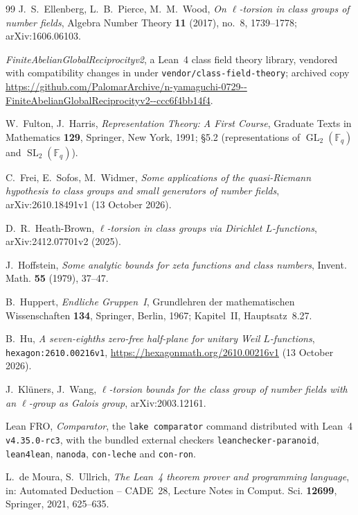 \documentclass[11pt]{amsart}
\theoremstyle{definition}
\theoremstyle{remark}
\newcommand{\F}{\mathbb{F}}
\DeclareMathOperator{\GL}{GL}
\DeclareMathOperator{\SL}{SL}
\begin{document}
\begin{thebibliography}{99}
J.~S.~Ellenberg, L.~B.~Pierce, M.~M.~Wood, \emph{On $\ell$-torsion in class groups of number fields}, Algebra Number
Theory \textbf{11} (2017), no.~8, 1739--1778; arXiv:1606.06103.

\emph{FiniteAbelianGlobalReciprocityv2}, a Lean~4 class field theory library, vendored with compatibility changes in
\cite{CT-Lean} under \texttt{vendor/class-field-theory}; archived copy
\url{https://github.com/PalomarArchive/n-yamaguchi-0729--FiniteAbelianGlobalReciprocityv2--ccc6f4bb14f4}.

W.~Fulton, J.~Harris, \emph{Representation Theory: A First Course}, Graduate Texts in Mathematics \textbf{129},
Springer, New York, 1991; \S5.2 (representations of $\GL_2(\F_q)$ and $\SL_2(\F_q)$).

C.~Frei, E.~Sofos, M.~Widmer, \emph{Some applications of the quasi-Riemann hypothesis to class groups and small
generators of number fields}, arXiv:2610.18491v1 (13 October 2026).

D.~R.~Heath-Brown, \emph{$\ell$-torsion in class groups via Dirichlet $L$-functions}, arXiv:2412.07701v2 (2025).

J.~Hoffstein, \emph{Some analytic bounds for zeta functions and class numbers}, Invent. Math. \textbf{55} (1979),
37--47.

B.~Huppert, \emph{Endliche Gruppen~I}, Grundlehren der mathematischen Wissenschaften \textbf{134}, Springer,
Berlin, 1967; Kapitel~II, Hauptsatz~8.27.

B.~Hu, \emph{A seven-eighths zero-free half-plane for unitary Weil $L$-functions}, \texttt{hexagon:2610.00216v1},
\url{https://hexagonmath.org/2610.00216v1} (13 October 2026).

J.~Kl\"uners, J.~Wang, \emph{$\ell$-torsion bounds for the class group of number fields with an $\ell$-group as Galois
group}, arXiv:2003.12161.

Lean FRO, \emph{Comparator}, the \texttt{lake comparator} command distributed with Lean~4 \texttt{v4.35.0-rc3}, with
the bundled external checkers \texttt{leanchecker-paranoid}, \texttt{lean4lean}, \texttt{nanoda}, \texttt{con-leche}
and \texttt{con-ron}.

L.~de Moura, S.~Ullrich, \emph{The Lean~4 theorem prover and programming language}, in: Automated Deduction --
CADE~28, Lecture Notes in Comput. Sci. \textbf{12699}, Springer, 2021, 625--635.


\end{thebibliography}
\end{document}
